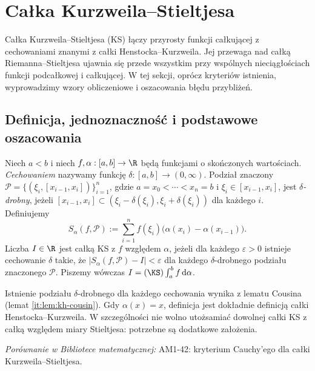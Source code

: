 \section{Całka Kurzweila--Stieltjesa}
\providecommand{\atlasref}[2]{#2}
\label{sec:kurzweil-stieltjes}
Całka Kurzweila--Stieltjesa (KS) łączy przyrosty funkcji całkującej z cechowaniami znanymi z całki Henstocka--Kurzweila. Jej przewaga nad całką Riemanna--Stieltjesa ujawnia się przede wszystkim przy wspólnych nieciągłościach funkcji podcałkowej i całkującej. W tej sekcji, oprócz kryteriów istnienia, wyprowadzimy wzory obliczeniowe i oszacowania błędu przybliżeń.

\subsection*{Definicja, jednoznaczność i podstawowe oszacowania}
\begin{definicja}
Niech $a<b$ i niech $f,\alpha:[a,b]\to\R$ będą funkcjami o skończonych wartościach. \emph{Cechowaniem} nazywamy funkcję $\delta:[a,b]\to(0,\infty)$. Podział znaczony $\mathcal P=\{(\xi_i,[x_{i-1},x_i])\}_{i=1}^n$, gdzie $a=x_0<\cdots<x_n=b$ i $\xi_i\in[x_{i-1},x_i]$, jest \emph{$\delta$-drobny}, jeżeli $[x_{i-1},x_i]\subset(\xi_i-\delta(\xi_i),\xi_i+\delta(\xi_i))$ dla każdego $i$. Definiujemy
\[
 S_\alpha(f,\mathcal P):=\sum_{i=1}^n f(\xi_i)\bigl(\alpha(x_i)-\alpha(x_{i-1})\bigr).
\]
Liczba $I\in\R$ jest całką KS z $f$ względem $\alpha$, jeżeli dla każdego $\varepsilon>0$ istnieje cechowanie $\delta$ takie, że $|S_\alpha(f,\mathcal P)-I|<\varepsilon$ dla każdego $\delta$-drobnego podziału znaczonego $\mathcal P$. Piszemy wówczas $I=(\KS)\int_a^b f\,\mathrm d\alpha$.
\end{definicja}
Istnienie podziału $\delta$-drobnego dla każdego cechowania wynika z lematu Cousina (lemat \ref{it:lem:kh-cousin}). Gdy $\alpha(x)=x$, definicja jest dokładnie definicją całki Henstocka--Kurzweila. W szczególności nie wolno utożsamiać dowolnej całki KS z całką względem miary Stieltjesa: potrzebne są dodatkowe założenia.

\noindent\emph{Porównanie w Bibliotece matematycznej:} \atlasref{AM1-42::tw:ks-cauchy}{AM1-42: kryterium Cauchy'ego dla całki Kurzweila–Stieltjesa}.

